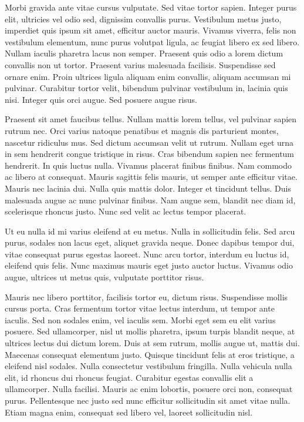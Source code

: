 Morbi gravida ante vitae cursus vulputate. Sed vitae tortor sapien. Integer purus elit, ultricies vel odio sed, dignissim convallis purus. Vestibulum metus justo, imperdiet quis ipsum sit amet, efficitur auctor mauris. Vivamus viverra, felis non vestibulum elementum, nunc purus volutpat ligula, ac feugiat libero ex sed libero. Nullam iaculis pharetra lacus non semper. Praesent quis odio a lorem dictum convallis non ut tortor. Praesent varius malesuada facilisis. Suspendisse sed ornare enim. Proin ultrices ligula aliquam enim convallis, aliquam accumsan mi pulvinar. Curabitur tortor velit, bibendum pulvinar vestibulum in, lacinia quis nisi. Integer quis orci augue. Sed posuere augue risus.

Praesent sit amet faucibus tellus. Nullam mattis lorem tellus, vel pulvinar sapien rutrum nec. Orci varius natoque penatibus et magnis dis parturient montes, nascetur ridiculus mus. Sed dictum accumsan velit ut rutrum. Nullam eget urna in sem hendrerit congue tristique in risus. Cras bibendum sapien nec fermentum hendrerit. In quis luctus nulla. Vivamus placerat finibus finibus. Nam commodo ac libero at consequat. Mauris sagittis felis mauris, ut semper ante efficitur vitae. Mauris nec lacinia dui. Nulla quis mattis dolor. Integer et tincidunt tellus. Duis malesuada augue ac nunc pulvinar finibus. Nam augue sem, blandit nec diam id, scelerisque rhoncus justo. Nunc sed velit ac lectus tempor placerat.

Ut eu nulla id mi varius eleifend at eu metus. Nulla in sollicitudin felis. Sed arcu purus, sodales non lacus eget, aliquet gravida neque. Donec dapibus tempor dui, vitae consequat purus egestas laoreet. Nunc arcu tortor, interdum eu luctus id, eleifend quis felis. Nunc maximus mauris eget justo auctor luctus. Vivamus odio augue, ultrices ut metus quis, vulputate porttitor risus.

Mauris nec libero porttitor, facilisis tortor eu, dictum risus. Suspendisse mollis cursus porta. Cras fermentum tortor vitae lectus interdum, ut tempor ante iaculis. Sed non sodales enim, vel iaculis sem. Morbi eget sem eu elit varius posuere. Sed ullamcorper, nisl ut mollis pharetra, ipsum turpis blandit neque, at ultrices lectus dui dictum lorem. Duis at sem rutrum, mollis augue ut, mattis dui. Maecenas consequat elementum justo. Quisque tincidunt felis at eros tristique, a eleifend nisl sodales. Nulla consectetur vestibulum fringilla. Nulla vehicula nulla elit, id rhoncus dui rhoncus feugiat. Curabitur egestas convallis elit a ullamcorper. Nulla facilisi. Mauris ac enim lobortis, posuere orci non, consequat purus. Pellentesque nec justo sed nunc efficitur sollicitudin sit amet vitae nulla. Etiam magna enim, consequat sed libero vel, laoreet sollicitudin nisl.

